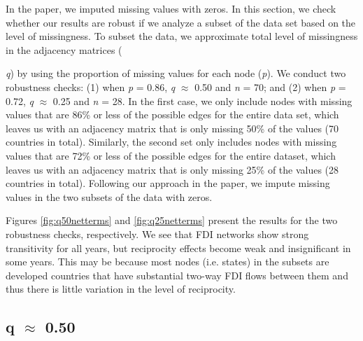 \documentclass[reqno,onecolumn,letterpaper,12pt]{article}
\begin{document}
In the paper, we imputed missing values with zeros. In this section, we check whether our results are robust if we analyze a subset of the data set based on the level of missingness. To subset the data, we approximate total level of missingness in the adjacency matrices ({\emph{q}) by using the proportion of missing values for each node (\emph{p}). We conduct two robustness checks: (1) when \emph{p} = 0.86,  \emph{q} $\approx$ 0.50 and  \emph{n} = 70; and (2) when \emph{p} = 0.72, \emph{q} $\approx$ 0.25 and  \emph{n} = 28. In the first case, we only include nodes with missing values that are 86\% or less of the possible edges for the entire data set, which leaves us with an adjacency matrix that is only missing 50\% of the values (70 countries in total). Similarly, the second set only includes nodes with missing values that are 72\% or less of the possible edges for the entire dataset, which leaves us with an adjacency matrix that is only missing 25\% of the values (28 countries in total).  Following our approach in the paper, we impute missing values in the two subsets of the data with zeros.

Figures \ref{fig:q50netterms} and \ref{fig:q25netterms} present the results for the two robustness checks, respectively. We see that FDI networks show strong transitivity for all years, but reciprocity effects become weak and insignificant in some years. This may be because most nodes (i.e. states) in the subsets are developed countries that have substantial two-way FDI flows between them and thus there is little variation in the level of reciprocity.

\clearpage

\subsection{q $\approx$  0.50}

}
\end{document}
